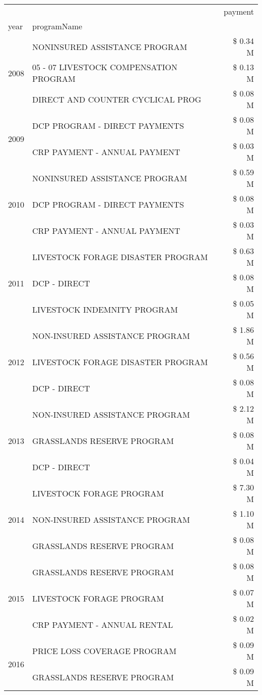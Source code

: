 \begin{tabular}{llr}
\toprule
 &  & payment \\
year & programName &  \\
\midrule
\multirow[t]{3}{*}{2008} & NONINSURED ASSISTANCE PROGRAM & \$ 0.34 M \\
 & 05 - 07 LIVESTOCK COMPENSATION PROGRAM & \$ 0.13 M \\
 & DIRECT AND COUNTER CYCLICAL PROG & \$ 0.08 M \\
\cline{1-3}
\multirow[t]{2}{*}{2009} & DCP PROGRAM - DIRECT PAYMENTS & \$ 0.08 M \\
 & CRP PAYMENT - ANNUAL PAYMENT & \$ 0.03 M \\
\cline{1-3}
\multirow[t]{3}{*}{2010} & NONINSURED ASSISTANCE PROGRAM & \$ 0.59 M \\
 & DCP PROGRAM - DIRECT PAYMENTS & \$ 0.08 M \\
 & CRP PAYMENT - ANNUAL PAYMENT & \$ 0.03 M \\
\cline{1-3}
\multirow[t]{3}{*}{2011} & LIVESTOCK FORAGE DISASTER PROGRAM & \$ 0.63 M \\
 & DCP - DIRECT & \$ 0.08 M \\
 & LIVESTOCK INDEMNITY PROGRAM & \$ 0.05 M \\
\cline{1-3}
\multirow[t]{3}{*}{2012} & NON-INSURED ASSISTANCE PROGRAM & \$ 1.86 M \\
 & LIVESTOCK FORAGE DISASTER PROGRAM & \$ 0.56 M \\
 & DCP - DIRECT & \$ 0.08 M \\
\cline{1-3}
\multirow[t]{3}{*}{2013} & NON-INSURED ASSISTANCE PROGRAM & \$ 2.12 M \\
 & GRASSLANDS RESERVE PROGRAM & \$ 0.08 M \\
 & DCP - DIRECT & \$ 0.04 M \\
\cline{1-3}
\multirow[t]{3}{*}{2014} & LIVESTOCK FORAGE PROGRAM & \$ 7.30 M \\
 & NON-INSURED ASSISTANCE PROGRAM & \$ 1.10 M \\
 & GRASSLANDS RESERVE PROGRAM & \$ 0.08 M \\
\cline{1-3}
\multirow[t]{3}{*}{2015} & GRASSLANDS RESERVE PROGRAM & \$ 0.08 M \\
 & LIVESTOCK FORAGE PROGRAM & \$ 0.07 M \\
 & CRP PAYMENT - ANNUAL RENTAL & \$ 0.02 M \\
\cline{1-3}
\multirow[t]{3}{*}{2016} & PRICE LOSS COVERAGE PROGRAM & \$ 0.09 M \\
 & GRASSLANDS RESERVE PROGRAM & \$ 0.09 M \\

\end{tabular}
